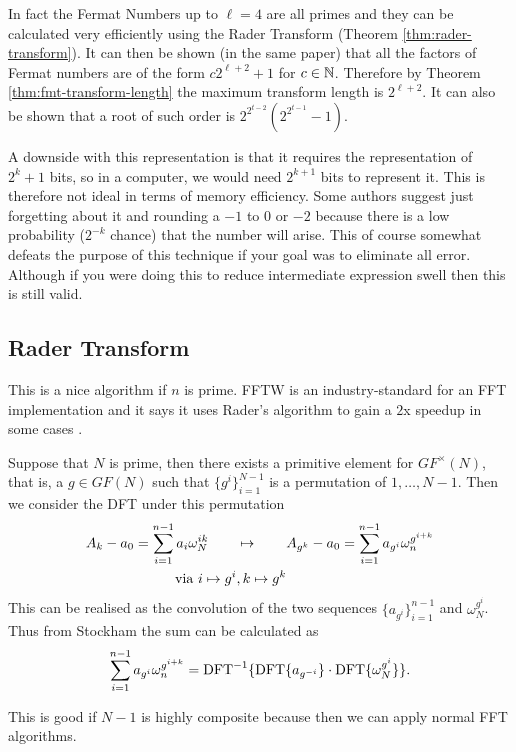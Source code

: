 In fact the Fermat Numbers up to $\ell = 4$ are all primes and they can be calculated very efficiently using the Rader Transform (Theorem \ref{thm:rader-transform}). It can then be shown (in the same paper) that all the factors of Fermat numbers are of the form $c2^{\ell + 2} + 1$ for $c \in {\mathbb N}$. Therefore by Theorem \ref{thm:fmt-transform-length} the maximum transform length is $2^{\ell + 2}$. It can also be shown that a root of such order is $2^{2^{t-2}}(2^{2^{t-1}} - 1)$.

A downside with this representation is that it requires the representation of $2^k + 1$ bits, so in a computer, we would need $2^{k+1}$ bits to represent it. This is therefore not ideal in terms of memory efficiency. Some authors suggest just forgetting about it and rounding a $-1$ to $0$ or $-2$ because there is a low probability ($2^{-k}$ chance) that the number will arise. This of course somewhat defeats the purpose of this technique if your goal was to eliminate all error. Although if you were doing this to reduce intermediate expression swell then this is still valid.

\subsection{Rader Transform}
\label{subsec:rt}

This is a nice algorithm if $n$ is prime. FFTW is an industry-standard for an FFT implementation and it says it uses Rader's algorithm to gain a $2$x speedup in some cases \cite{fftw}.

\begin{theorem}\label{thm:rader-transform}
    Suppose that $N$ is prime, then there exists a primitive element for $GF^\times(N)$, that is, a $g \in GF(N)$ such that $\{g^i\}_{i=1}^{N-1}$ is a permutation of $1, \ldots, N-1$. Then we consider the DFT under this permutation
    \begin{align*}
      A_k - a_0 = \sum^{n-1}_{i=1} a_i \omega_N^{ik} \qquad &\mapsto \qquad A_{g^k} - a_0 = \sum^{n-1}_{i=1} a_{g^i}\omega_n^{g^{i+k}}\\
      \textrm{ via } i \mapsto g^i&, k \mapsto g^k
    \end{align*}
    This can be realised as the convolution of the two sequences $\{a_{g^i}\}_{i=1}^{n-1}$ and $\omega_N^{g^i}$. Thus from Stockham \cite{stockham} the sum can be calculated as
    \[
      \sum^{n-1}_{i=1} a_{g^i}\omega_n^{g^{i+k}} = \textrm{DFT}^{-1}\{\textrm{DFT}\{a_{g^{-i}}\}\cdot \textrm{DFT}\{\omega_N^{g^i}\}\}.
    \]
\end{theorem}
This is good if $N - 1$ is highly composite because then we can apply normal FFT algorithms.

